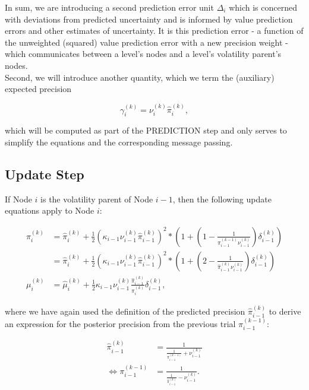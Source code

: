 In sum, we are introducing a second prediction error unit $\Delta_i$ which is concerned with deviations from predicted uncertainty and is informed by value prediction errors and other estimates of uncertainty. It is this prediction error - a function of the unweighted (squared) value prediction error with a new precision weight - which communicates between a level's nodes and a level's volatility parent's nodes.\\

Second, we will introduce another quantity, which we term the (auxiliary) expected precision

\begin{equation}
  \gamma_i^{(k)} = \nu_i^{(k)} \hat{\pi}_i^{(k)},
\end{equation}

which will be computed as part of the \textsf{PREDICTION step} and only serves to simplify the equations and the corresponding message passing.

\subsection{Update Step}
If Node $i$ is the volatility parent of Node $i-1$, then the following update equations apply to Node $i$:

\begin{align*}
\pi_i^{(k)} &= \hat{\pi}_i^{(k)} 
			+ \frac{1}{2}(\kappa_{i-1} \nu_{i-1}^{(k)} \hat{\pi}_{i-1}^{(k)})^2
			* (1 + (1 - \frac{1}{\pi_{i-1}^{(k-1)} \nu_{i-1}^{(k)}}) 
			\delta_{i-1}^{(k)})\\
			&= \hat{\pi}_i^{(k)} 
			+ \frac{1}{2}(\kappa_{i-1} \nu_{i-1}^{(k)} \hat{\pi}_{i-1}^{(k)})^2
			* (1 + (2 - \frac{1}{\hat{\pi}_{i-1}^{(k)} \nu_{i-1}^{(k)}}) 
			\delta_{i-1}^{(k)})\\
\mu_i^{(k)} &= \hat{\mu}_i^{(k)} 
			+ \frac{1}{2}\kappa_{i-1} \nu_{i-1}^{(k)} 
			\frac{\hat{\pi}_{i-1}^{(k)}}{\pi_{i}^{(k)}} \delta_{i-1}^{(k)},
\end{align*}			

where we have again used the definition of the predicted precision $\hat{\pi}_{i-1}^{(k)}$ to derive an expression for the posterior precision from the previous trial $\pi_{i-1}^{(k-1)}$:

\begin{align*}
\hat{\pi}_{i-1}^{(k)} 			  &= \frac{1}{ \frac{1}{\pi_{i-1}^{(k-1)}}
								  + \nu_{i-1}^{(k)} }\\
\Leftrightarrow \pi_{i-1}^{(k-1)} &= \frac{1}{ \frac{1}{\hat{\pi}_{i-1}^{(k)}}
					  			  - \nu_{i-1}^{(k)} }.
\end{align*}

